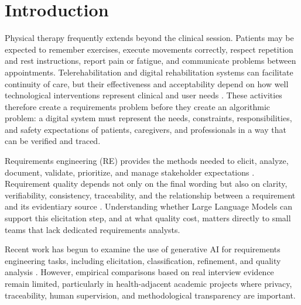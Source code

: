 \documentclass[pdflatex,sn-basic]{sn-jnl}
\begin{document}

\maketitle

\section{Introduction}

Physical therapy frequently extends beyond the clinical session. Patients may be expected to remember exercises, execute movements correctly, respect repetition and rest instructions, report pain or fatigue, and communicate problems between appointments. Telerehabilitation and digital rehabilitation systems can facilitate continuity of care, but their effectiveness and acceptability depend on how well technological interventions represent clinical and user needs \citep{munoztomas2023telerehabilitation,susomarti2021effectiveness,gava2022shoulder}. These activities therefore create a requirements problem before they create an algorithmic problem: a digital system must represent the needs, constraints, responsibilities, and safety expectations of patients, caregivers, and professionals in a way that can be verified and traced.

Requirements engineering (RE) provides the methods needed to elicit, analyze, document, validate, prioritize, and manage stakeholder expectations \citep{pohl2010requirements,iso29148_2018,sommerville2016software,pressman2020software}. Requirement quality depends not only on the final wording but also on clarity, verifiability, consistency, traceability, and the relationship between a requirement and its evidentiary source \citep{grosser2024templates,knauss2018clarification}. Understanding whether Large Language Models can support this elicitation step, and at what quality cost, matters directly to small teams that lack dedicated requirements analysts.

Recent work has begun to examine the use of generative AI for requirements engineering tasks, including elicitation, classification, refinement, and quality analysis \citep{cheng2026genai}. However, empirical comparisons based on real interview evidence remain limited, particularly in health-adjacent academic projects where privacy, traceability, human supervision, and methodological transparency are important.
\end{document}
